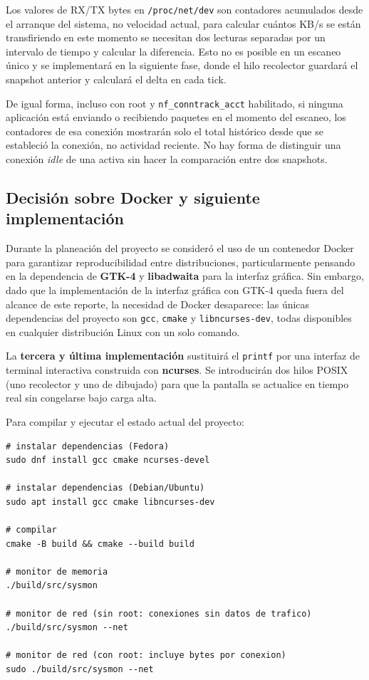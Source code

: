 \documentclass[12pt,letterpaper]{article}
\begin{document}
Los valores de RX/TX bytes en \texttt{/proc/net/dev} son contadores acumulados desde el arranque del sistema,
no velocidad actual, para calcular cuántos KB/s se están transfiriendo en este momento se necesitan dos lecturas
separadas por un intervalo de tiempo y calcular la diferencia. Esto no es posible en un escaneo único y se
implementará en la siguiente fase, donde el hilo recolector guardará el snapshot anterior y calculará el delta
en cada tick.

\medskip

De igual forma, incluso con root y \texttt{nf\_conntrack\_acct} habilitado, si ninguna aplicación está enviando
o recibiendo paquetes en el momento del escaneo, los contadores de esa conexión mostrarán solo el total
histórico desde que se estableció la conexión, no actividad reciente. No hay forma de distinguir una conexión
\textit{idle} de una activa sin hacer la comparación entre dos snapshots.

\subsection*{Decisión sobre Docker y siguiente implementación}

Durante la planeación del proyecto se consideró el uso de un contenedor Docker para garantizar reproducibilidad
entre distribuciones, particularmente pensando en la dependencia de \textbf{GTK-4} y \textbf{libadwaita} para la
interfaz gráfica. Sin embargo, dado que la implementación de la interfaz gráfica con GTK-4 queda fuera del
alcance de este reporte, la necesidad de Docker desaparece: las únicas dependencias del proyecto son
\texttt{gcc}, \texttt{cmake} y \texttt{libncurses-dev}, todas disponibles en cualquier distribución Linux con
un solo comando.

\medskip

La \textbf{tercera y última implementación} sustituirá el \texttt{printf} por una interfaz de terminal
interactiva construida con \textbf{ncurses}. Se introducirán dos hilos POSIX (uno recolector y uno de dibujado)
para que la pantalla se actualice en tiempo real sin congelarse bajo carga alta.

\medskip

Para compilar y ejecutar el estado actual del proyecto:

\begin{Verbatim}[frame=single, rulecolor=\color{black!20}, fontsize=\small]
# instalar dependencias (Fedora)
sudo dnf install gcc cmake ncurses-devel

# instalar dependencias (Debian/Ubuntu)
sudo apt install gcc cmake libncurses-dev

# compilar
cmake -B build && cmake --build build

# monitor de memoria
./build/src/sysmon

# monitor de red (sin root: conexiones sin datos de trafico)
./build/src/sysmon --net

# monitor de red (con root: incluye bytes por conexion)
sudo ./build/src/sysmon --net
\end{Verbatim}
\end{document}
